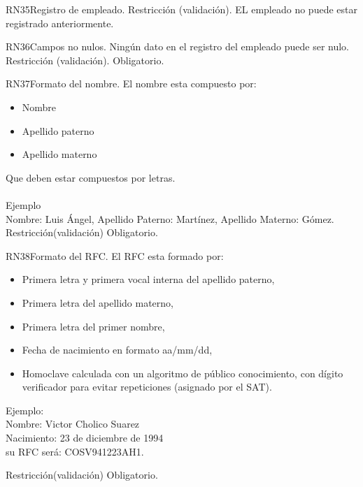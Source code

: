 \begin{BussinesRule}{RN35}{Registro de empleado.} 
	\BRitem[Tipo:] Restricción (validación).
	\BRitem[Descripción:]EL empleado no puede estar registrado anteriormente.
\end{BussinesRule}

\begin{BussinesRule}{RN36}{Campos no nulos.} 
	\BRitem[Descripción:] Ningún dato en el registro del empleado puede ser nulo.
	\BRitem[Tipo:] Restricción (validación).
	\BRitem[Nivel:] Obligatorio.
\end{BussinesRule}

\begin{BussinesRule}{RN37}{Formato del nombre.}
	\BRitem[Descripción:] El nombre esta compuesto por:
		\begin{itemize} 
			\item Nombre
			\item Apellido paterno 
			\item Apellido materno 
		\end{itemize}
		Que deben estar compuestos por letras.\\\\
Ejemplo \\
	Nombre: Luis Ángel, Apellido Paterno: Martínez, Apellido Materno: Gómez.
	\BRitem[Tipo:] Restricción(validación)
	\BRitem[Nivel:] Obligatorio.
\end{BussinesRule}


\begin{BussinesRule}{RN38}{Formato del RFC.}
	\BRitem[Descripción:] El RFC esta formado por:
		\begin{itemize}
			\item Primera letra y primera vocal interna del apellido paterno,
			\item Primera letra del apellido materno,
			\item Primera letra del primer nombre,
			\item Fecha de nacimiento en formato aa/mm/dd,
			\item Homoclave calculada con un algoritmo de público conocimiento, con dígito verificador para evitar repeticiones (asignado por el SAT).				
		\end{itemize}

Ejemplo:\\
Nombre: Victor Cholico Suarez \\
Nacimiento: 23 de diciembre de 1994 \\
su RFC será: COSV941223AH1.


	\BRitem[Tipo:] Restricción(validación)
	\BRitem[Nivel:] Obligatorio.
\end{BussinesRule}

